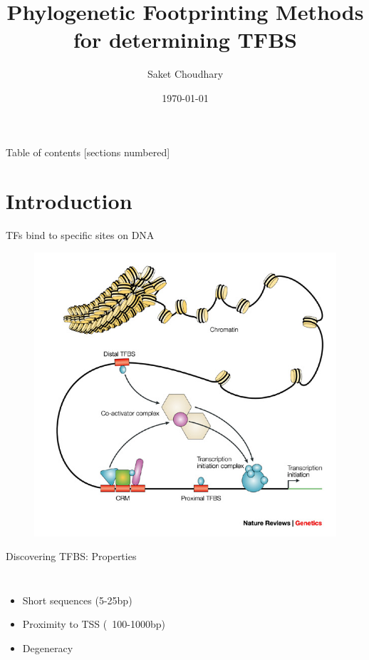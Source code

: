 \documentclass[12pt]{beamer}
\title{Phylogenetic Footprinting Methods for determining TFBS}
\subtitle{}
\date{\today}
\author{Saket Choudhary}
\begin{document}
\maketitle

\begin{frame}{Table of contents}
  [sections numbered]
  \tableofcontents[hideallsubsections]
\end{frame}

\section{Introduction}
{
\begin{frame}[fragile]{TFs bind to specific sites on DNA}

\begin{figure}
\includegraphics[width=0.8\linewidth]{images/crm.jpg}
\end{figure}
 
\end{frame}
}

\begin{frame}[fragile]{Discovering TFBS: Properties}
  \begin{columns}[T,onlytextwidth]
\begin{itemize}
\item Short sequences (5-25bp)
\item Proximity to TSS (~100-1000bp)
\item Degeneracy
\end{itemize}
\end{columns}
\end{frame}
\end{document}
